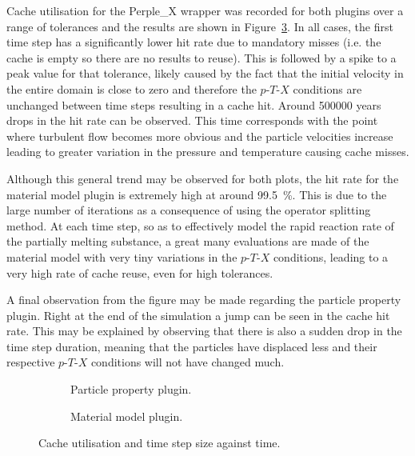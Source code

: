 Cache utilisation for the Perple\_X wrapper was recorded for both plugins over a range of tolerances and the results are shown in Figure~\ref{fig:cache_usage}. 
In all cases, the first time step has a significantly lower hit rate due to mandatory misses (i.e. the cache is empty so there are no results to reuse).
This is followed by a spike to a peak value for that tolerance, likely caused by the fact that the initial velocity in the entire domain is close to zero and therefore the $p$-$T$-$X$ conditions are unchanged between time steps resulting in a cache hit.
Around \num{500000} years drops in the hit rate can be observed.
This time corresponds with the point where turbulent flow becomes more obvious and the particle velocities increase leading to greater variation in the pressure and temperature causing cache misses.

Although this general trend may be observed for both plots, the hit rate for the material model plugin is extremely high at around \SI{99.5}{\percent}.
This is due to the large number of iterations as a consequence of using the operator splitting method.
At each time step, so as to effectively model the rapid reaction rate of the partially melting substance, a great many evaluations are made of the material model with very tiny variations in the $p$-$T$-$X$ conditions, leading to a very high rate of cache reuse, even for high tolerances.

A final observation from the figure may be made regarding the particle property plugin.
Right at the end of the simulation a jump can be seen in the cache hit rate.
This may be explained by observing that there is also a sudden drop in the time step duration, meaning that the particles have displaced less and their respective $p$-$T$-$X$ conditions will not have changed much.

\begin{figure}[htb]
    \centering
    \begin{subfigure}{0.49\textwidth}
        
        \caption{Particle property plugin.}
        \label{fig:cache_usage_particle_property}
        \end{subfigure}
    \hfill
    \begin{subfigure}{0.49\textwidth}
        \centering
        
        \caption{Material model plugin.}
        \label{fig:cache_usage_material_model}
    \end{subfigure}
    \caption{Cache utilisation and time step size against time.}
    \label{fig:cache_usage}
\end{figure}
